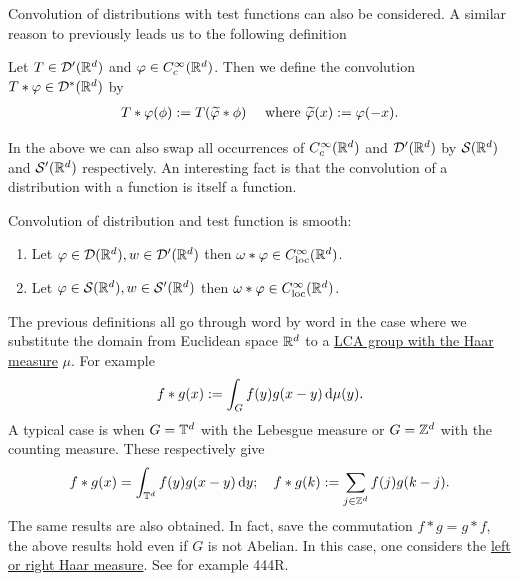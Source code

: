 \documentclass[
    a4paper,
    DIV=14,
    abstract=true,
    numbers=noenddot
]{scrartcl}
\begin{document}
Convolution of distributions with test functions can also be considered. A similar reason to previously leads us to the following definition
\begin{definition}
	Let $T \in \mathcal{D}'(\mathbb{R}^d)$ and $\varphi \in C_c^\infty(\mathbb{R}^d)$. Then we define the convolution $T*\varphi \in \mathcal{D}^*(\mathbb{R}^d)$ by
	\begin{align*}
		T*\varphi(\phi):=T(\widetilde{\varphi}*\phi) \quad \text{ where } \widetilde{\varphi}(x):=\varphi(-x) .
	\end{align*}
\end{definition}
In the above we can also swap all occurrences of $C_c^\infty(\mathbb{R}^d)$ and $\mathcal{D}'(\mathbb{R}^d)$ by $\mathcal{S}(\mathbb{R}^d)$ and $\mathcal{S}'(\mathbb{R}^d)$ respectively. An interesting fact is that the convolution of a distribution with a function is itself a function.
\begin{proposition}Convolution of distribution and test function is smooth:
	\begin{enumerate}        \item Let $\varphi \in \mathcal{D}(\mathbb{R}^d), w \in \mathcal{D}'(\mathbb{R}^d) $ then $\omega * \varphi \in  C^\infty _{\mathrm{loc}}(\mathbb{R}^d)$.
		\item  Let $\varphi \in \mathcal{S}(\mathbb{R}^d), w \in \mathcal{S}'(\mathbb{R}^d) $ then $\omega * \varphi \in  C^\infty _{\mathrm{loc}}(\mathbb{R}^d)$.
	\end{enumerate}
\end{proposition}
The previous definitions all go through word by word in the case where we substitute the domain from Euclidean space  $\mathbb{R}^d$ to a \href{https://en.wikipedia.org/wiki/Haar_measure}{LCA group with the Haar measure} $\mu $. For example
\begin{align*}
	f*g(x):= \int_{G}f(y)g(x-y) \,\mathrm{d} \mu (y).
\end{align*}
A typical case is when $G=\mathbb{T}^d$ with the Lebesgue measure or $G=\mathbb{Z}^d$ with the counting measure. These respectively give
\begin{align*}
	f*g(x)=\int_{\mathbb{T}^d}f(y)g(x-y) \,\mathrm{d} y; \quad      f*g(k):= \sum_{j\in \mathbb{Z}^d} f(j)g(k-j)  .
\end{align*}
The same results are also obtained. In fact, save the commutation $f*g=g*f$, the above results hold even if $G$ is not Abelian. In this case, one considers the \href{https://en.wikipedia.org/wiki/Haar_measure#:~:text=%5Bedit%5D-,There,-is%2C%20up}{left or right Haar measure}. See for example \cite{fremlin2006measure} 444R.
\end{document}
